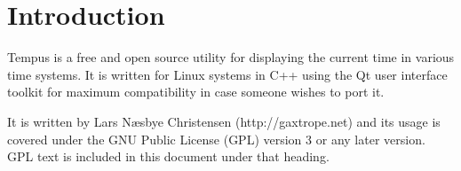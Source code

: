 \section{Introduction}
Tempus is a free and open source utility for displaying the current time in various time systems. It is written for Linux systems in C++ using the Qt user interface toolkit for maximum compatibility in case someone wishes to port it.

It is written by Lars N{\ae}sbye Christensen (http://gaxtrope.net) and its usage is covered under the GNU Public License (GPL) version 3 or any later version. GPL text is included in this document under that heading.


